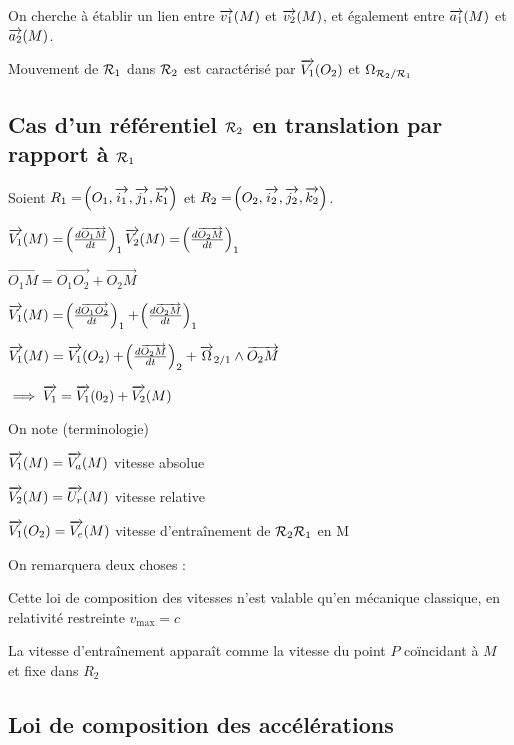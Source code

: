 \documentclass[a4paper,french,bookmarks]{book}
\begin{document}
    On cherche à établir un lien entre $\overrightarrow{v_1}\!\left(M\right)$ et $\overrightarrow{v_2}\!\left(M\right)$, et également entre $\overrightarrow{a_1}\!\left(M\right)$ et $\overrightarrow{a_2}\!\left(M\right)$.
    
    Mouvement de $\mathcal{R}_1$ dans $\mathcal{R}_2$ est caractérisé par
    $\overrightarrow{V_1}\!\left(O_2\right)$ et $\Omega_{\mathcal{R}_2 / \mathcal{R}_1}$
    
    \subsection{Cas d'un référentiel $\mathcal{R}_2$ en translation par rapport à $\mathcal{R}_1$}
    
    Soient $R_1 = \!\left(O_1, \overrightarrow{i_1}, \overrightarrow{j_1}, \overrightarrow{k_1}\right)$ et $R_2 = \!\left(O_2, \overrightarrow{i_2}, \overrightarrow{j_2}, \overrightarrow{k_2}\right)$.
    
    \(\overrightarrow{V_1}\!\left(M\right) = \!\left(\frac{d\overrightarrow{O_1 M}}{dt}\right)_1
    \overrightarrow{V_2}\!\left(M\right) = \!\left(\frac{d\overrightarrow{O_2 M}}{dt}\right)_1\)
    
    $\vec{O_1 M} = \vec{O_1 O_2} + \vec{O_2 M}$
    
    $\overrightarrow{V_1} \!\left(M\right) = \!\left(\frac{d\overrightarrow{O_1 O_2}}{dt}\right)_1 + \!\left(\frac{d\overrightarrow{O_2 M}}{dt}\right)_1$
    
    $\overrightarrow{V_1}\!\left(M\right) = \overrightarrow{V_1}\!\left(O_2\right) + \!\left(\frac{d\overrightarrow{O_2 M}}{dt}\right)_2 + \overrightarrow{\Omega}_{2/1} \land \overrightarrow{O_2 M}$
    
    $\implies \overrightarrow{V_1} = \overrightarrow{V_1}\!\left(0_2\right) + \overrightarrow{V_2}\!\left(M\right)$
    
    On note (terminologie)
    \begin{enumerate}
        \itt $\overrightarrow{V_1}\!\left(M\right) = \overrightarrow{V_a}\!\left(M\right)$ vitesse absolue
        
        \itt $\overrightarrow{V_2}\!\left(M\right) = \overrightarrow{U_r}\!\left(M\right)$ vitesse relative
        
        \itt $\overrightarrow{V_1}\!\left(O_2\right) = \overrightarrow{V_e}\!\left(M\right)$ vitesse d'entraînement de $\mathcal{R}_2 \\ \mathcal{R}_1$ en M
    \end{enumerate}

    On remarquera deux choses :
    \begin{enumerate}
        \itt Cette loi de composition des vitesses n'est valable qu'en mécanique classique, en relativité restreinte \(v_\text{max} = c\)

        \itt La vitesse d'entraînement apparaît comme la vitesse du point \(P\) coïncidant à \(M\) et fixe dans \(R_2\)
    \end{enumerate}

  \subsection{Loi de composition des accélérations}
\end{document}
